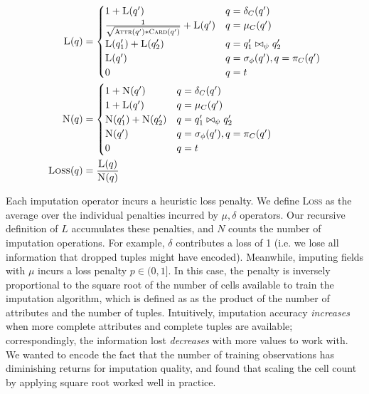 \begin{align*}
  \textsc{L}(q) &= \begin{cases}
     1 + \textsc{L}(q') & q = \delta_C(q') \\
    \frac{1}{\sqrt{ \textsc{Attr}(q') * \textsc{Card}(q')}} + \textsc{L}(q')  & q = \mu_C(q') \\
    \textsc{L}(q_1') + \textsc{L}(q_2') & q = q_1' \bowtie_\psi q_2' \\
    \textsc{L}(q') & q = \sigma_\phi(q'), q = \pi_C(q') \\
    0 & q = t\\
  \end{cases}\\
    \textsc{N}(q) &= \begin{cases}
     1 + \textsc{N}(q') & q = \delta_C(q') \\
     1 + \textsc{L}(q')  & q = \mu_C(q') \\
    \textsc{N}(q_1') + \textsc{N}(q_2') & q = q_1' \bowtie_\psi q_2' \\
    \textsc{N}(q') & q = \sigma_\phi(q'), q = \pi_C(q') \\
    0 & q = t\\
  \end{cases}\\
  \textsc{Loss}(q) &= \frac{\textsc{L}(q)}{\textsc{N}(q)}
\end{align*}

Each imputation operator incurs a heuristic loss penalty. We define \textsc{Loss} as the average over the individual penalties incurred
by $\mu,\delta$ operators. Our recursive definition of $L$ accumulates these penalties, and $N$ counts the number of imputation operations.
For example, $\delta$ contributes a loss of 1 (i.e. we lose all information  that dropped tuples
might have encoded). Meanwhile, imputing \nullv{} fields with $\mu$ incurs a loss penalty $p \in (0, 1]$. In this case, the penalty is
inversely proportional to the square root of the number of cells available to train the imputation algorithm, which is defined as
as the product of the number of attributes and the number of tuples. Intuitively, imputation
accuracy \textit{increases} when more complete attributes and complete tuples are available;
correspondingly, the information lost \textit{decreases} with more values to work
with. We wanted to encode the fact that the number of training observations has diminishing returns for imputation quality,
and found that scaling the cell count by applying square root worked well in practice.

